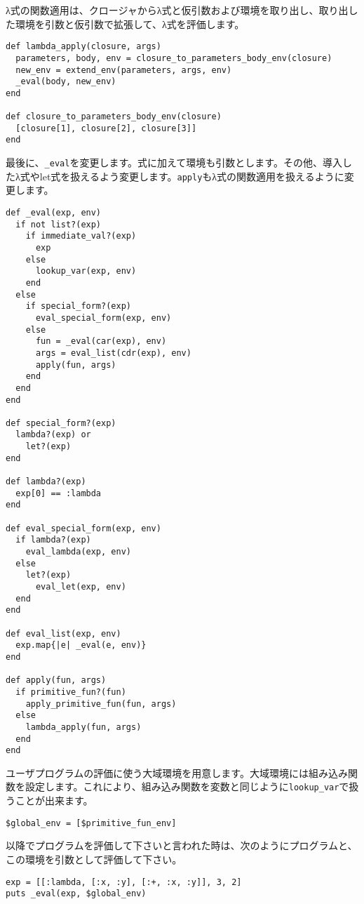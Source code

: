 λ式の関数適用は、クロージャからλ式と仮引数および環境を取り出し、取り出した環境を引数と仮引数で拡張して、λ式を評価します。

\begin{lstlisting}
def lambda_apply(closure, args)
  parameters, body, env = closure_to_parameters_body_env(closure)
  new_env = extend_env(parameters, args, env)
  _eval(body, new_env)
end

def closure_to_parameters_body_env(closure)
  [closure[1], closure[2], closure[3]]
end
\end{lstlisting}

最後に、{\tt \_eval}を変更します。式に加えて環境も引数とします。その他、導入したλ式やlet式を扱えるよう変更します。{\tt apply}もλ式の関数適用を扱えるように変更します。

\begin{lstlisting}
def _eval(exp, env)
  if not list?(exp)
    if immediate_val?(exp)
      exp
    else 
      lookup_var(exp, env)
    end
  else
    if special_form?(exp)
      eval_special_form(exp, env)
    else
      fun = _eval(car(exp), env)
      args = eval_list(cdr(exp), env)
      apply(fun, args)
    end
  end
end

def special_form?(exp)
  lambda?(exp) or 
    let?(exp)
end

def lambda?(exp)
  exp[0] == :lambda
end

def eval_special_form(exp, env)
  if lambda?(exp)
    eval_lambda(exp, env)
  else
    let?(exp)
      eval_let(exp, env)
  end
end

def eval_list(exp, env)
  exp.map{|e| _eval(e, env)}
end    

def apply(fun, args)
  if primitive_fun?(fun)
    apply_primitive_fun(fun, args)
  else
    lambda_apply(fun, args)
  end
end
\end{lstlisting}

ユーザプログラムの評価に使う大域環境を用意します。大域環境には組み込み関数を設定します。これにより、組み込み関数を変数と同じように{\tt lookup\_var}で扱うことが出来ます。

\begin{lstlisting}
$global_env = [$primitive_fun_env]
\end{lstlisting}

以降でプログラムを評価して下さいと言われた時は、次のようにプログラムと、
この環境を引数として評価して下さい。

\begin{lstlisting}
exp = [[:lambda, [:x, :y], [:+, :x, :y]], 3, 2]
puts _eval(exp, $global_env)
\end{lstlisting}

